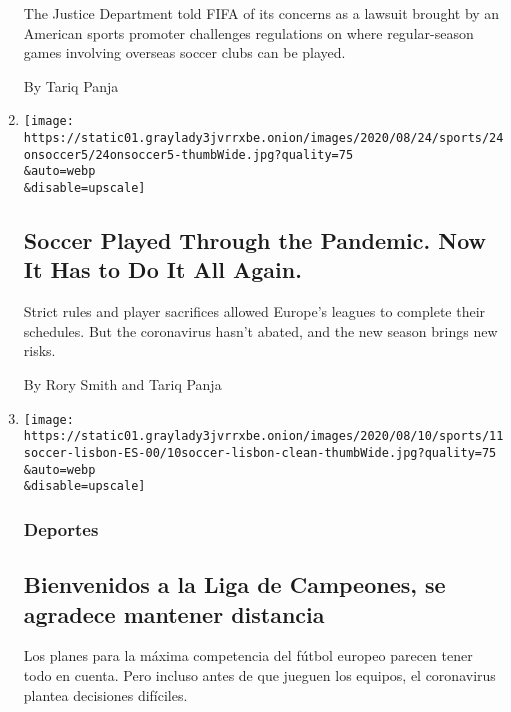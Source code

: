 \begin{enumerate}
  The Justice Department told FIFA of its concerns as a lawsuit brought
  by an American sports promoter challenges regulations on where
  regular-season games involving overseas soccer clubs can be played.

  By Tariq Panja
\item
  \href{/2020/08/24/sports/soccer/champions-league-premier-league-virus.html}{}

  \texttt{[image: https://static01.graylady3jvrrxbe.onion/images/2020/08/24/sports/24onsoccer5/24onsoccer5-thumbWide.jpg?quality=75\\\&auto=webp\\\&disable=upscale]}

  \hypertarget{soccer-played-through-the-pandemic-now-it-has-to-do-it-all-again}{%
  \subsection{Soccer Played Through the Pandemic. Now It Has to Do It
  All
  Again.}\label{soccer-played-through-the-pandemic-now-it-has-to-do-it-all-again}}

  Strict rules and player sacrifices allowed Europe's leagues to
  complete their schedules. But the coronavirus hasn't abated, and the
  new season brings new risks.

  By Rory Smith and Tariq Panja
\item
  \href{/es/2020/08/11/espanol/deportes/champions-league-covid-reinicio.html}{}

  \texttt{[image: https://static01.graylady3jvrrxbe.onion/images/2020/08/10/sports/11soccer-lisbon-ES-00/10soccer-lisbon-clean-thumbWide.jpg?quality=75\\\&auto=webp\\\&disable=upscale]}

  \hypertarget{deportes}{%
  \subsubsection{Deportes}\label{deportes}}

  \hypertarget{bienvenidos-a-la-liga-de-campeones-se-agradece-mantener-distancia}{%
  \subsection{Bienvenidos a la Liga de Campeones, se agradece mantener
  distancia}\label{bienvenidos-a-la-liga-de-campeones-se-agradece-mantener-distancia}}

  Los planes para la máxima competencia del fútbol europeo parecen tener
  todo en cuenta. Pero incluso antes de que jueguen los equipos, el
  coronavirus plantea decisiones difíciles.


\end{enumerate}
